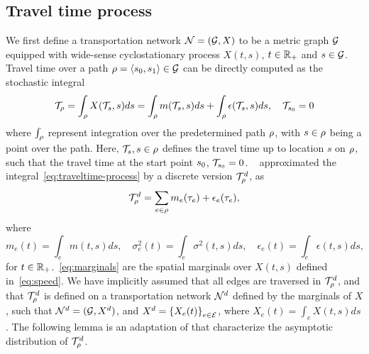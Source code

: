 \documentclass[12pt]{article}
\begin{document}
{{%
\subsection{Travel time process}\label{sec:traveltime-process}
We first define a transportation network $\mathcal{N} = (\mathcal{G}, X)$ to be a metric graph $\mathcal{G}$ equipped with wide-sense cyclostationary process $X(t, s)$, $t \in \mathbb{R}_+$ and $s \in \mathcal{G}$. Travel time over a path $\rho = {\langle {s_0},{ s_1}\rangle } \in \mathcal{G}$ can be directly computed as the stochastic integral 
\begin{equation}
    \label{eq:traveltime-process}
\mathcal{T}_\rho = \int_\rho X(\mathcal{T}_s, s)ds = \int_\rho m(\mathcal{T}_s, s)ds + \int_{\rho} \epsilon(\mathcal{T}_s,s)ds, \quad \mathcal{T}_{s_0} = 0
\end{equation}
where $\int_\rho$ represent integration over the predetermined path $\rho$, with $s \in \rho$ being a point over the path. Here, $\mathcal{T}_s, s \in \rho$ defines the travel time up to location $s$ on $\rho$, such that the travel time at the start point ${s_0}$, $\mathcal{T}_{s_0} =0$. ~\cite{elmasri2020predictive} approximated the integral~\eqref{eq:traveltime-process} by a discrete version $\mathcal{T}_\rho^d$, as 
\[\mathcal{T}^d_\rho = \sum_{e \in \rho} m_e(\tau_e) + \epsilon_e(\tau_e), \]
where 
\begin{equation}\label{eq:marginals}
    m_e(t) = \int_e m(t,s)ds, \quad \sigma^2_e(t) = \int_e \sigma^2(t,s)ds, \quad \epsilon_e(t) = \int_e \epsilon(t,s)ds,
\end{equation}
for $t \in \mathbb{R}_+$.~\eqref{eq:marginals} are the spatial marginals over $X(t,s)$ defined in~\eqref{eq:speed}. We have implicitly assumed that all edges are traversed in $\mathcal{T}_\rho^d$, and that $\mathcal{T}_\rho^d$ is defined on a transportation network $\mathcal{N}^d$ defined by the marginals of $X$, such that $\mathcal{N}^d = (\mathcal{G}, X^d)$, and $X^d = \left\{X_e(t)\right\}_{e \in \mathcal{E}}$, where $X_e(t) = \int_e X(t,s)ds$. The following lemma is an adaptation of \citet[Lem~6, Them.~6]{elmasri2020predictive} that characterize the asymptotic distribution of $\mathcal{T}_\rho^d$. 

}}
\end{document}
